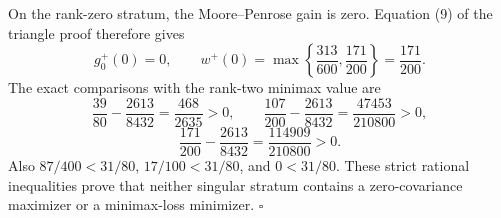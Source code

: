 On the rank-zero stratum, the Moore--Penrose gain is zero.  Equation (9) of the triangle proof therefore gives
\[
 g_0^{+}(0)=0,
 \qquad
 w^{+}(0)=\max\left\{\frac{313}{600},\frac{171}{200}\right\}=\frac{171}{200}.
\]
The exact comparisons with the rank-two minimax value are
\[
 \frac{39}{80}-\frac{2613}{8432}=\frac{468}{2635}>0,
 \qquad
 \frac{107}{200}-\frac{2613}{8432}=\frac{47453}{210800}>0,
\]
\[
 \frac{171}{200}-\frac{2613}{8432}=\frac{114909}{210800}>0.
\]
Also \(87/400<31/80\), \(17/100<31/80\), and \(0<31/80\).  These strict rational inequalities prove that neither singular stratum contains a zero-covariance maximizer or a minimax-loss minimizer. \(\square\)